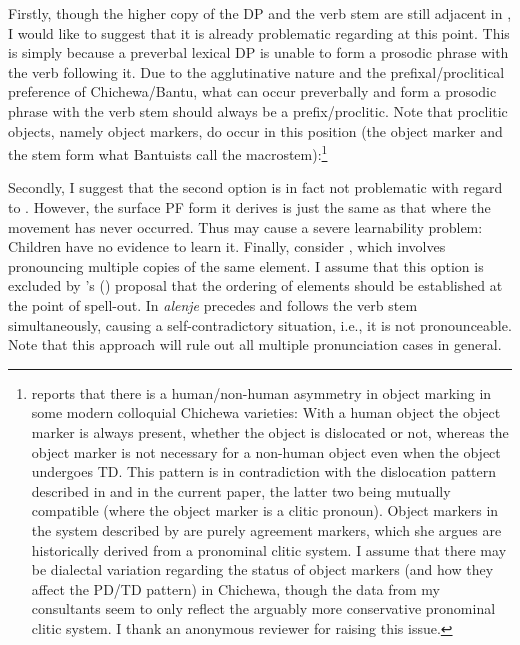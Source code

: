 \documentclass[output=paper,colorlinks,citecolor=brown
]{langscibook}
\begin{document}
 Firstly, though the higher copy of the DP and the verb stem are still adjacent in , I would like to suggest that it is already problematic regarding  at this point. This is simply because a preverbal lexical DP is unable to form a prosodic phrase with the verb following it. Due to the agglutinative nature and the prefixal/proclitical preference of Chichewa/Bantu, what can occur preverbally and form a prosodic phrase with the verb stem should always be a prefix/proclitic. Note that proclitic objects, namely object markers, do occur in this position (the object marker and the stem form what Bantuists call the macrostem):\footnote{\citealp{downing2018dom} reports that there is a human/non-human asymmetry in object marking in some modern colloquial Chichewa varieties: With a human object the object marker is always present, whether the object is dislocated or not, whereas the object marker is not necessary for a non-human object even when the object undergoes TD. This pattern is in contradiction with the dislocation pattern described in \citealp{bresnan1987topic} and in the current paper, the latter two being mutually compatible (where the object marker is a clitic pronoun). Object markers in the system described by \citealp{downing2018dom} are purely agreement markers, which she argues are historically derived from a pronominal clitic system. I assume that there may be dialectal variation regarding the status of object markers (and how they affect the PD/TD pattern) in Chichewa, though the data from my consultants seem to only reflect the arguably more conservative pronominal clitic system. I thank an anonymous reviewer for raising this issue.}

\ea[]
  {\gll Mj\'{u}uci zi=n\'{a}= \Lb{macrostem} \circled{w\'{a}=}luum-a ]\\
  10.bees 10\textsc{sm}=\textsc{pst}= {} 2\textsc{om}=bite-\textsc{fv}\\
  \glt `The bees bit them.'}
\z

 Secondly, I suggest that the second option  is in fact not problematic with regard to . However, the surface PF form it derives is just the same as that where the movement has never occurred. Thus  may cause a severe learnability problem: Children have no evidence to learn it. Finally, consider , which involves pronouncing multiple copies of the same element. I assume that this option is excluded by \citeauthor{fox2005cyclic}'s (\citeyear{fox2005cyclic}) proposal that the ordering of elements should be established at the point of spell-out. In  \textit{alenje} precedes and follows the verb stem simultaneously, causing a self-contradictory situation, i.e., it is not pronounceable. Note that this approach will rule out all multiple pronunciation cases in general.
\end{document}
